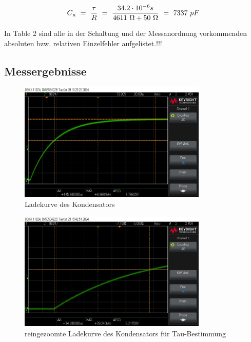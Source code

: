 \documentclass[a4paper,12pt]{article}
\begin{document}
\[
C\textsubscript{x} ~=~ \frac{\tau}{R} ~=~ \frac{34.2 \cdot 10^{-6}s}{4611~\Omega + 50~\Omega} ~=~ 7337~pF
\]

\noindent In Table 2 sind alle in der Schaltung und der Messanordnung vorkommenden absoluten bzw. relativen Einzelfehler aufgelistet.!!!

\subsection{Messergebnisse}

\begin{figure}[H]
    \centering
    \includegraphics[width=0.8\textwidth]{../Quellen/Labor2/scope_0.png}
\caption{Ladekurve des Kondensators}
\end{figure}

\begin{figure}[H]
    \centering
    \includegraphics[width=0.8\textwidth]{../Quellen/Labor2/scope_1.png}
\caption{reingezoomte Ladekurve des Kondensators für Tau-Bestimmung}
\end{figure}
\end{document}
